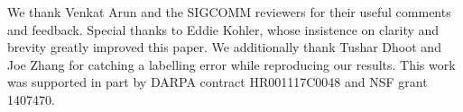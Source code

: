 \label{s:acknowledgements}
 We thank
Venkat Arun and the SIGCOMM reviewers for their useful comments and feedback. Special thanks to Eddie Kohler, whose insistence on clarity and brevity greatly improved this paper.
We additionally thank Tushar Dhoot and Joe Zhang for catching a labelling error while reproducing our results.
This work was supported in part by DARPA contract HR001117C0048 and NSF grant 1407470.
